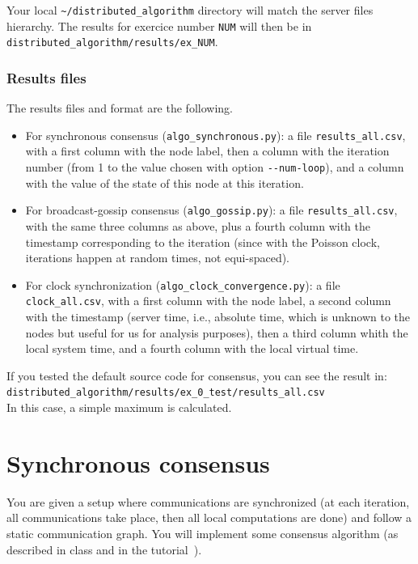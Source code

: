 \documentclass{article}
\begin{document}
Your local \verb=~/distributed_algorithm= directory will match the server files hierarchy.
The results for exercice number \verb=NUM= will then be in \verb=distributed_algorithm/results/ex_NUM=.

\subsubsection{Results files}

The results files and format are the following.

\begin{itemize}
\item For synchronous consensus (\verb=algo_synchronous.py=):
a file \verb=results_all.csv=, with a first column with the node label, then a column with the iteration number (from 1 to the value chosen with option \verb=--num-loop=), and a column with the value of the state of this node at this iteration.
\item For broadcast-gossip consensus (\verb=algo_gossip.py=):
a file \verb=results_all.csv=, with the same three columns as above, plus a fourth column with the timestamp corresponding to the iteration (since with the Poisson clock, iterations happen at random times, not equi-spaced).
\item For clock synchronization (\verb=algo_clock_convergence.py=):
a file \verb=clock_all.csv=, with a first column with the node label, a second column with the timestamp (server time, i.e., absolute time, which is unknown to the nodes but useful for us for analysis purposes), then a third column whith the local system time, and a fourth column with the local virtual time.
\end{itemize}
If you tested the default source code for consensus, you can see the result in:\\ \verb=distributed_algorithm/results/ex_0_test/results_all.csv=\\
In this case, a simple maximum is calculated.


\newpage



\section{Synchronous consensus}
You are given a setup where communications are synchronized (at each iteration,
all communications take place, then all local computations are done) and follow a static communication graph.
You will implement some consensus algorithm (as described in class and in the tutorial~\cite{consensus-tutorial}).
\end{document}
